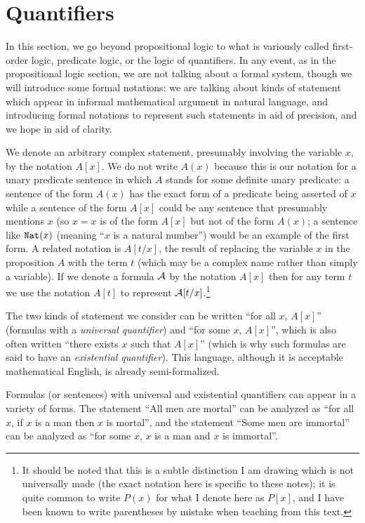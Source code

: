 \documentclass[12pt]{book}
\begin{document}
\section{Quantifiers}

In this section, we go beyond propositional logic to what is variously
called first-order logic, predicate logic, or the logic of
quantifiers.  In any event, as in the propositional logic section, we
are not talking about a formal system, though we will introduce some
formal notations: we are talking about kinds of statement which appear
in informal mathematical argument in natural language, and introducing formal notations to represent such statements in aid of precision, and we hope in aid of clarity.

We denote an arbitrary complex statement, presumably involving the
variable $x$, by the notation $A[x]$.  We do not write $A(x)$ because
this is our notation for a unary predicate sentence in which $A$
stands for some definite unary predicate: a sentence of the form
$A(x)$ has the exact form of a predicate being asserted of $x$ while a
sentence of the form $A[x]$ could be any sentence that presumably
mentions $x$ (so $x=x$ is of the form $A[x]$ but not of the form
$A(x)$; a sentence like ${\tt Nat}(x)$ (meaning ``$x$ is a natural
number'') would be an example of the first form.  A related notation
is $A[t/x]$, the result of replacing the variable $x$ in the
proposition $A$ with the term $t$ (which may be a complex name rather
than simply a variable).  If we denote a formula $\cal A$ by the
notation $A[x]$ then for any term $t$ we use the notation $A[t]$ to
represent ${\cal A}[t/x]$.\footnote{It should be noted that this is a
subtle distinction I am drawing which is not universally made (the
exact notation here is specific to these notes); it is quite common to
write $P(x)$ for what I denote here as $P[x]$, and I have been known to write parentheses by mistake when teaching from this text.}

The two kinds of statement we consider can be written ``for all $x$,
$A[x]$'' (formulas with a {\em universal quantifier\/}) and ``for
some $x$, $A[x]$'', which is also often written ``there exists $x$
such that $A[x]$'' (which is why such formulas are said to have an
{\em existential quantifier\/}).  This language, although it is
acceptable mathematical English, is already semi-formalized.

Formulas (or sentences) with universal and existential quantifiers can
appear in a variety of forms.  The statement ``All men are mortal''
can be analyzed as ``for all $x$, if $x$ is a man then $x$ is
mortal'', and the statement ``Some men are immortal'' can be analyzed
as ``for some $x$, $x$ is a man and $x$ is immortal''.
\end{document}
